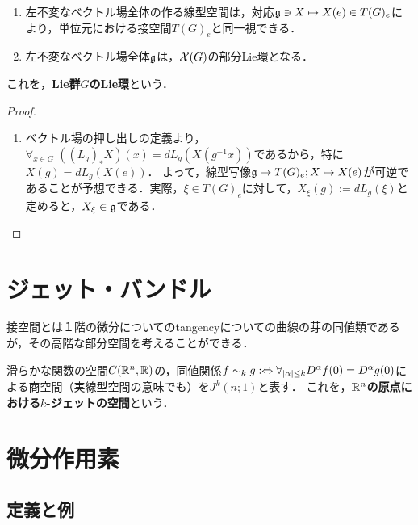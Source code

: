 \documentclass[uplatex,dvipdfmx]{jsreport}
\begin{document}
\begin{theorem}\mbox{}
    \begin{enumerate}
        \item 左不変なベクトル場全体の作る線型空間は，対応$\mathfrak{g}\ni X\mapsto X(e)\in T(G)_e$により，単位元における接空間$T(G)_e$と同一視できる．
        \item 左不変なベクトル場全体$\mathfrak{g}$は，$\mathcal{X}(G)$の部分Lie環となる．
    \end{enumerate}
    これを，\textbf{Lie群$G$のLie環}という．
\end{theorem}
\begin{proof}\mbox{}
    \begin{enumerate}
        \item ベクトル場の押し出しの定義より，$\forall_{x\in G}\;((L_g)_*X)(x)=dL_g(X(g^{-1}x))$であるから，特に$X(g)=dL_g(X(e))$．
        よって，線型写像$\mathfrak{g}\to T(G)_e;X\mapsto X(e)$が可逆であることが予想できる．実際，$\xi\in T(G)_e$に対して，$X_\xi(g):=dL_g(\xi)$と定めると，$X_\xi\in\mathfrak{g}$である．
    \end{enumerate}
\end{proof}

\section{ジェット・バンドル}

\begin{tcolorbox}[colframe=ForestGreen, colback=ForestGreen!10!white,breakable,colbacktitle=ForestGreen!40!white,coltitle=black,fonttitle=\bfseries\sffamily,
title=]
    接空間とは１階の微分についてのtangencyについての曲線の芽の同値類であるが，その高階な部分空間を考えることができる．
\end{tcolorbox}

\begin{definition}
    滑らかな関数の空間$C(\mathbb{R}^n,\mathbb{R})$の，同値関係$f\sim_kg:\Leftrightarrow \forall_{\lvert\alpha\rvert\le k}D^\alpha f(0)=D^\alpha g(0)$による商空間（実線型空間の意味でも）を$J^k(n;1)$と表す．
    これを，\textbf{$\mathbb{R}^n$の原点における$k$-ジェットの空間}という．
\end{definition}

\section{微分作用素}

\subsection{定義と例}
\end{document}
